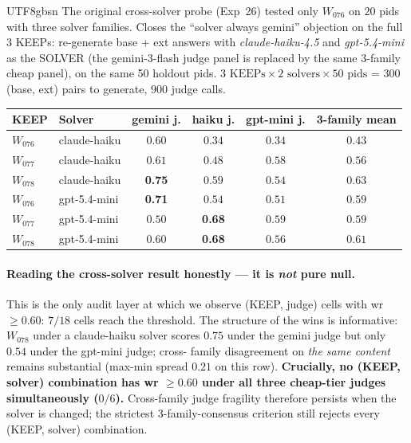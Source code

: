 \documentclass{article}
\begin{document}
\begin{CJK*}{UTF8}{gbsn}
The original cross-solver probe (Exp~26) tested only \(W_{076}\)
on \(20\) pids with three solver families. Closes the
``solver always gemini'' objection on the full \(3\) KEEPs:
re-generate base + ext answers with \emph{claude-haiku-4.5} and
\emph{gpt-5.4-mini} as the SOLVER (the gemini-3-flash judge panel
is replaced by the same 3-family cheap panel), on the same 50
holdout pids. \(3 \text{ KEEPs} \times 2\text{ solvers} \times
50\text{ pids}\) = \(300\) (base, ext) pairs to generate, \(900\)
judge calls.

\begin{center}\small
\begin{tabular}{l l c c c c}
  \toprule
  KEEP & Solver & gemini j. & haiku j. & gpt-mini j. & 3-family mean \\
  \midrule
  \(W_{076}\) & claude-haiku & \(0.60\) & \(0.34\) & \(0.34\) & \(0.43\) \\
  \(W_{077}\) & claude-haiku & \(0.61\) & \(0.48\) & \(0.58\) & \(0.56\) \\
  \(W_{078}\) & claude-haiku & \textbf{0.75} & \(0.59\) & \(0.54\) & \(0.63\) \\
  \(W_{076}\) & gpt-5.4-mini & \textbf{0.71} & \(0.54\) & \(0.51\) & \(0.59\) \\
  \(W_{077}\) & gpt-5.4-mini & \(0.50\) & \textbf{0.68} & \(0.59\) & \(0.59\) \\
  \(W_{078}\) & gpt-5.4-mini & \(0.60\) & \textbf{0.68} & \(0.56\) & \(0.61\) \\
  \bottomrule
\end{tabular}
\end{center}

\paragraph{Reading the cross-solver result honestly --- it is
\emph{not} pure null.} This is the only audit layer at which we
observe (KEEP, judge) cells with wr \(\geq 0.60\): \(7/18\) cells
reach the threshold. The structure of the wins is informative:
\(W_{078}\) under a claude-haiku solver scores \(0.75\) under the
gemini judge but only \(0.54\) under the gpt-mini judge; cross-
family disagreement on \emph{the same content} remains
substantial (max-min spread \(0.21\) on this row).
\textbf{Crucially, no (KEEP, solver) combination has wr \(\geq
0.60\) under all three cheap-tier judges simultaneously
(\(0/6\)).} Cross-family judge fragility therefore persists when
the solver is changed; the strictest 3-family-consensus criterion
still rejects every (KEEP, solver) combination.


\end{CJK*}
\end{document}
